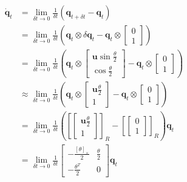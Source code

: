 \begin{equation}
\label{eqn:2.41}
\begin{aligned} 
\dot{\mathbf{q}}_{t} &= \lim _{\delta t \rightarrow 0} \frac{1}{\delta t}\left(\mathbf{q}_{t+\delta t}-\mathbf{q}_{t}\right) \\
&= \lim _{\delta t \rightarrow 0} \frac{1}{\delta t}\left(\mathbf{q}_{t} \otimes \delta {\mathbf{q}_{t}}-\mathbf{q}_{t} \otimes \left[ \begin{array}{l}{0} \\ {1}\end{array}\right]\right) \\
&= \lim _{\delta t \rightarrow 0} \frac{1}{\delta t}\left(\mathbf{q}_{t} \otimes \left[ \begin{array}{c}{\mathbf{u} \sin \frac{\theta}{2}} \\ {\cos \frac{\theta}{2}}\end{array}\right]-\mathbf{q}_{t} \otimes \left[ \begin{array}{l}{0} \\ {1}\end{array}\right]\right) \\
& \approx \lim _{\delta t \rightarrow 0} \frac{1}{\delta t} \left( \mathbf{q}_{t} \otimes \left[ \begin{array}{c}{\mathbf{u} \frac{\theta}{2}} \\ {1}\end{array}\right]-\mathbf{q}_{t} \otimes \left[ \begin{array}{l}{0} \\ {1}\end{array}\right] \right) \\
&= \lim _{\delta t \rightarrow 0} \frac{1}{\delta t} \left( \left[ \left[ \begin{array}{c}{\mathbf{u} \frac{\theta}{2}} \\ {1}\end{array}\right]\right]_R-\left[\left[ \begin{array}{l}{0} \\ {1}\end{array}\right]\right]_R \right) \mathbf{\mathbf{q}}_t \\
&= \lim _{\delta t \rightarrow 0} \frac{1}{\delta t} \left[ \begin{array}{cc}{-\frac {[\theta]_{\times}} {2}} & {\frac{\theta}{2}} \\ {-\frac{\theta^{T}}{2}} & {0}\end{array}\right]\mathbf{\mathbf{q}}_t
\end{aligned} 
\end{equation}
